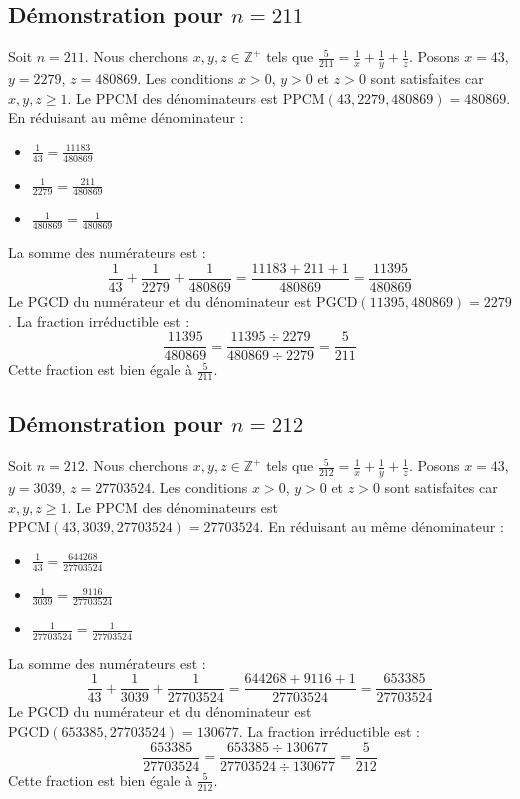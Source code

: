 \documentclass[11pt,a4paper]{article}
\begin{document}
\subsection{Démonstration pour $n = 211$}
Soit $n = 211$. Nous cherchons $x, y, z \in \mathbb{Z}^{+}$ tels que $\frac{5}{211} = \frac{1}{x} + \frac{1}{y} + \frac{1}{z}$.
Posons $x = 43$, $y = 2279$, $z = 480869$.
Les conditions $x > 0$, $y > 0$ et $z > 0$ sont satisfaites car $x, y, z \geq 1$.
Le PPCM des dénominateurs est $\text{PPCM}(43, 2279, 480869) = 480869$.
En réduisant au même dénominateur :
\begin{itemize}
    \item $\frac{1}{43} = \frac{11183}{480869}$
    \item $\frac{1}{2279} = \frac{211}{480869}$
    \item $\frac{1}{480869} = \frac{1}{480869}$
\end{itemize}
La somme des numérateurs est :
$$ \frac{1}{43} + \frac{1}{2279} + \frac{1}{480869} = \frac{11183 + 211 + 1}{480869} = \frac{11395}{480869} $$
Le PGCD du numérateur et du dénominateur est $\text{PGCD}(11395, 480869) = 2279$.
La fraction irréductible est :
$$ \frac{11395}{480869} = \frac{11395 \div 2279}{480869 \div 2279} = \frac{5}{211} $$
Cette fraction est bien égale à $\frac{5}{211}$.

\subsection{Démonstration pour $n = 212$}
Soit $n = 212$. Nous cherchons $x, y, z \in \mathbb{Z}^{+}$ tels que $\frac{5}{212} = \frac{1}{x} + \frac{1}{y} + \frac{1}{z}$.
Posons $x = 43$, $y = 3039$, $z = 27703524$.
Les conditions $x > 0$, $y > 0$ et $z > 0$ sont satisfaites car $x, y, z \geq 1$.
Le PPCM des dénominateurs est $\text{PPCM}(43, 3039, 27703524) = 27703524$.
En réduisant au même dénominateur :
\begin{itemize}
    \item $\frac{1}{43} = \frac{644268}{27703524}$
    \item $\frac{1}{3039} = \frac{9116}{27703524}$
    \item $\frac{1}{27703524} = \frac{1}{27703524}$
\end{itemize}
La somme des numérateurs est :
$$ \frac{1}{43} + \frac{1}{3039} + \frac{1}{27703524} = \frac{644268 + 9116 + 1}{27703524} = \frac{653385}{27703524} $$
Le PGCD du numérateur et du dénominateur est $\text{PGCD}(653385, 27703524) = 130677$.
La fraction irréductible est :
$$ \frac{653385}{27703524} = \frac{653385 \div 130677}{27703524 \div 130677} = \frac{5}{212} $$
Cette fraction est bien égale à $\frac{5}{212}$.
\end{document}
